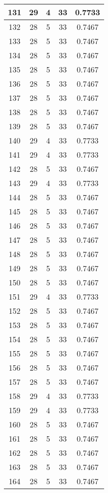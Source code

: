 \documentclass[letterpaper, 12pt]{article}
\begin{document}
\begin{longtable}{|c|c|c|c|c|}
\hline
131 & 29 & 4 & 33 & 0.7733 \\
\hline
132 & 28 & 5 & 33 & 0.7467 \\
\hline
133 & 28 & 5 & 33 & 0.7467 \\
\hline
134 & 28 & 5 & 33 & 0.7467 \\
\hline
135 & 28 & 5 & 33 & 0.7467 \\
\hline
136 & 28 & 5 & 33 & 0.7467 \\
\hline
137 & 28 & 5 & 33 & 0.7467 \\
\hline
138 & 28 & 5 & 33 & 0.7467 \\
\hline
139 & 28 & 5 & 33 & 0.7467 \\
\hline
140 & 29 & 4 & 33 & 0.7733 \\
\hline
141 & 29 & 4 & 33 & 0.7733 \\
\hline
142 & 28 & 5 & 33 & 0.7467 \\
\hline
143 & 29 & 4 & 33 & 0.7733 \\
\hline
144 & 28 & 5 & 33 & 0.7467 \\
\hline
145 & 28 & 5 & 33 & 0.7467 \\
\hline
146 & 28 & 5 & 33 & 0.7467 \\
\hline
147 & 28 & 5 & 33 & 0.7467 \\
\hline
148 & 28 & 5 & 33 & 0.7467 \\
\hline
149 & 28 & 5 & 33 & 0.7467 \\
\hline
150 & 28 & 5 & 33 & 0.7467 \\
\hline
151 & 29 & 4 & 33 & 0.7733 \\
\hline
152 & 28 & 5 & 33 & 0.7467 \\
\hline
153 & 28 & 5 & 33 & 0.7467 \\
\hline
154 & 28 & 5 & 33 & 0.7467 \\
\hline
155 & 28 & 5 & 33 & 0.7467 \\
\hline
156 & 28 & 5 & 33 & 0.7467 \\
\hline
157 & 28 & 5 & 33 & 0.7467 \\
\hline
158 & 29 & 4 & 33 & 0.7733 \\
\hline
159 & 29 & 4 & 33 & 0.7733 \\
\hline
160 & 28 & 5 & 33 & 0.7467 \\
\hline
161 & 28 & 5 & 33 & 0.7467 \\
\hline
162 & 28 & 5 & 33 & 0.7467 \\
\hline
163 & 28 & 5 & 33 & 0.7467 \\
\hline
164 & 28 & 5 & 33 & 0.7467 \\

\end{longtable}
\end{document}
